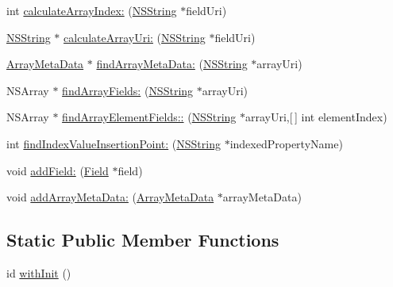 \begin{DoxyCompactItemize}
int \hyperlink{interface_mobile_object_a8f0ed77157a50c86ccff642a2443168d}{calculate\-Array\-Index\-:} (\hyperlink{class_n_s_string}{\-N\-S\-String} $\ast$field\-Uri)
\item 
\hyperlink{class_n_s_string}{\-N\-S\-String} $\ast$ \hyperlink{interface_mobile_object_a64803c8493550bff058f6b4d387ec0d4}{calculate\-Array\-Uri\-:} (\hyperlink{class_n_s_string}{\-N\-S\-String} $\ast$field\-Uri)
\item 
\hyperlink{interface_array_meta_data}{\-Array\-Meta\-Data} $\ast$ \hyperlink{interface_mobile_object_a8ebfcd27e9b97aa820564fdac11c81ef}{find\-Array\-Meta\-Data\-:} (\hyperlink{class_n_s_string}{\-N\-S\-String} $\ast$array\-Uri)
\item 
\-N\-S\-Array $\ast$ \hyperlink{interface_mobile_object_a981953ff8a64b10fef2229997b014f68}{find\-Array\-Fields\-:} (\hyperlink{class_n_s_string}{\-N\-S\-String} $\ast$array\-Uri)
\item 
\-N\-S\-Array $\ast$ \hyperlink{interface_mobile_object_a5a2b6c4c936aa527df4a0b897924bc65}{find\-Array\-Element\-Fields\-::} (\hyperlink{class_n_s_string}{\-N\-S\-String} $\ast$array\-Uri,\mbox{[}$\,$\mbox{]} int element\-Index)
\item 
int \hyperlink{interface_mobile_object_a4ebefdcabafadee90025cdfce0728c4c}{find\-Index\-Value\-Insertion\-Point\-:} (\hyperlink{class_n_s_string}{\-N\-S\-String} $\ast$indexed\-Property\-Name)
\item 
void \hyperlink{interface_mobile_object_a55fff87adc8588d1def2659211aff32d}{add\-Field\-:} (\hyperlink{interface_field}{\-Field} $\ast$field)
\item 
void \hyperlink{interface_mobile_object_a78113fbe14eae0cc25795b8b9365116e}{add\-Array\-Meta\-Data\-:} (\hyperlink{interface_array_meta_data}{\-Array\-Meta\-Data} $\ast$array\-Meta\-Data)
\end{DoxyCompactItemize}
\subsection*{\-Static \-Public \-Member \-Functions}
\begin{DoxyCompactItemize}
\item 
id \hyperlink{interface_mobile_object_a434d78bff82165d12b8f7451236a7d39}{with\-Init} ()
\end{DoxyCompactItemize}
